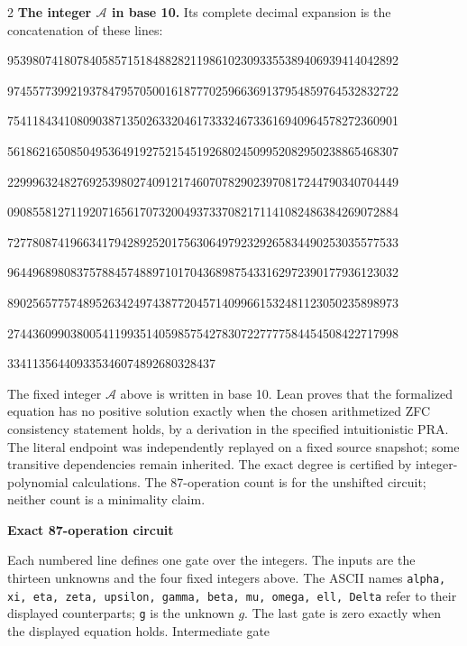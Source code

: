 \documentclass[10pt]{article}
\begin{document}
\begin{multicols}{2}
\textbf{The integer $\mathcal A$ in base 10.}
Its complete decimal expansion is the concatenation of these lines:\par
\begingroup\fontsize{7.7}{8.2}\selectfont{}\par
95398074180784058571518488282119861023093355389406939414042892\par
97455773992193784795705001618777025966369137954859764532832722\par
75411843410809038713502633204617333246733616940964578272360901\par
56186216508504953649192752154519268024509952082950238865468307\par
22999632482769253980274091217460707829023970817244790340704449\par
09085581271192071656170732004937337082171141082486384269072884\par
72778087419663417942892520175630649792329265834490253035577533\par
96449689808375788457488971017043689875433162972390177936123032\par
89025657757489526342497438772045714099661532481123050235898973\par
27443609903800541199351405985754278307227777584454508422717998\par
334113564409335346074892680328437\par
\endgroup
\normalfont\fontsize{7.7}{8.2}\selectfont
The fixed integer $\mathcal A$ above is written in base 10. Lean proves that
the formalized equation has no positive solution exactly when the chosen
arithmetized ZFC consistency statement holds, by a derivation in the specified
intuitionistic PRA. The literal endpoint was independently replayed on a fixed
source snapshot; some transitive dependencies remain inherited. The exact
degree is certified by integer-polynomial calculations. The 87-operation count
is for the unshifted circuit; neither count is a minimality claim.
\end{multicols}
\clearpage
\begin{center}{\large\bfseries Exact 87-operation circuit}\end{center}
Each numbered line defines one gate over the integers. The inputs are the
thirteen unknowns and the four fixed integers above. The ASCII names
\texttt{alpha, xi, eta, zeta, upsilon, gamma, beta, mu, omega, ell, Delta}
refer to their displayed counterparts; \texttt{g} is the unknown $g$. The last
gate is zero exactly when the displayed equation holds. Intermediate gate
\end{document}
